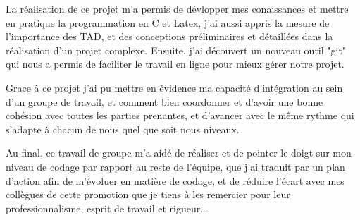 %
  La réalisation de ce projet m'a permis de dévlopper mes conaissances et mettre en pratique la
programmation en C et Latex, j'ai aussi appris la mesure de l'importance des TAD, et des conceptions 
préliminaires et détaillées dans la réalisation d'un projet complexe. Ensuite, j'ai découvert un nouveau outil "git" qui nous a permis de faciliter le travail en ligne pour mieux gérer notre projet.
 
  Grace à ce projet j'ai pu mettre en évidence ma capacité d'intégration au sein d'un groupe de travail, et comment bien coordonner et d'avoir une bonne cohésion avec toutes les parties prenantes, et d'avancer avec le même rythme qui s'adapte à chacun de nous quel que soit nous niveaux.

  Au final, ce travail de groupe m'a aidé de réaliser et de pointer le doigt sur mon niveau de codage par rapport au reste de l'équipe, que j'ai traduit par un plan d'action afin de m'évoluer en matière de codage, et de réduire l'écart avec mes collègues de cette promotion que je tiens à les remercier pour leur professionnalisme, esprit de travail et rigueur...
  
